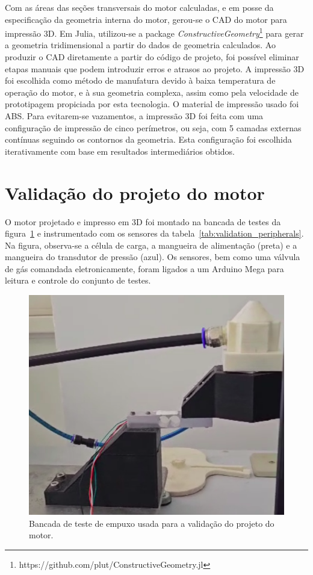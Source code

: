 Com as áreas das seções transversais do motor calculadas, e em posse da especificação da geometria interna do motor, gerou-se o CAD do motor para impressão 3D. Em Julia, utilizou-se a package \textit{ConstructiveGeometry}\footnote[1]{https://github.com/plut/ConstructiveGeometry.jl} para gerar a geometria tridimensional a partir do dados de geometria calculados. Ao produzir o CAD diretamente a partir do código de projeto, foi possível eliminar etapas manuais que podem introduzir erros e atrasos ao projeto. A impressão 3D foi escolhida como método de manufatura devido à baixa temperatura de operação do motor, e à sua geometria complexa, assim como pela velocidade de prototipagem propiciada por esta tecnologia. O material de impressão usado foi ABS\@. Para evitarem-se vazamentos, a impressão 3D foi feita com uma configuração de impressão de cinco perímetros, ou seja, com 5 camadas externas contínuas seguindo os contornos da geometria. Esta configuração foi escolhida iterativamente com base em resultados intermediários obtidos.

\section{Validação do projeto do motor}\label{sec:method_validation}

O motor projetado e impresso em 3D foi montado na bancada de testes da figura~\ref{fig:thrust_stand} e instrumentado com os sensores da tabela~\ref{tab:validation_peripherals}. Na figura, observa-se a célula de carga, a mangueira de alimentação (preta) e a mangueira do transdutor de pressão (azul). Os sensores, bem como uma válvula de gás comandada eletronicamente, foram ligados a um Arduino Mega para leitura e controle do conjunto de testes. 

\begin{figure}[htbp]
    \centering
    \includegraphics[height=.5\textheight]{img/thrust_stand.png}
    \caption{Bancada de teste de empuxo usada para a validação do projeto do motor.}\label{fig:thrust_stand}
\end{figure}

